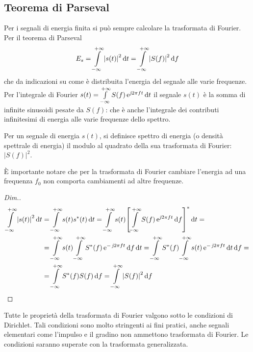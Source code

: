 \subsection{Teorema di Parseval}
Per i segnali di energia finita si può sempre calcolare la trasformata di Fourier. Per il teorema di Parseval
\begin{equation}
E_s=\int\limits_{-\infty}^{+\infty}{\left|{s(t)}\right|^2}{\,\mathop{}\!\mathrm{d}{t}}=\int\limits_{-\infty}^{+\infty}{\left|{S(f)}\right|^2}{\,\mathop{}\!\mathrm{d}{f}}
\label{eq:parseval}
\end{equation}
che da indicazioni su come è distribuita l'energia del segnale alle varie frequenze. Per l'integrale di Fourier $s(t)=\int\limits_{-\infty}^{+\infty}{S(f)\operatorname{e}^{\operatorname{\mathit{j}\!} 2\pi f t}}{\,\mathop{}\!\mathrm{d}{t}}$ il segnale $s(t)$ è la somma di infinite sinusoidi pesate da $S(f)$: che è anche l'integrale dei contributi infinitesimi di energia alle varie frequenze dello spettro.
\begin{nota}
	Per un segnale di energia $s(t)$, si definisce spettro di energia (o densità spettrale di energia) il modulo al quadrato della sua trasformata di Fourier: $|S(f)|^2$.
\end{nota}
\begin{nota}
	\`E importante notare che per la trasformata di Fourier cambiare l'energia ad una frequenza $f_0$ non comporta cambiamenti ad altre frequenze.
\end{nota}
\begin{proof}[Dim.]
\begin{align*}
\intinf{\abs{s(t)}^2}{t}&=\intinf{s(t)\conj{s}(t)}{t}
=\intinf{s(t)\conj{\left[\intinf{S(f)\e{\imath 2\pi f t}}{f}\right]}}{t}=\\
	&=\intinf{s(t)\intinf{\conj{S}(f)\e{-\imath 2\pi f t}}{f}}{t}=\intinf{\conj{S}(f)\intinf{s(t)\e{-\imath 2\pi f t}}{t}}{f}=\\
	&=\intinf{\conj{S}(f)S(f)}{f}=\intinf{\abs{S(f)}^2}{f}
\qedhere
\end{align*}
\end{proof}

\begin{nota}
	Tutte le proprietà della trasformata di Fourier valgono sotto le condizioni di Dirichlet. Tali condizioni sono molto stringenti ai fini pratici, anche segnali elementari come l'impulso e il gradino non ammettono trasformata di Fourier. Le condizioni saranno superate con la trasformata generalizzata. 
\end{nota}

